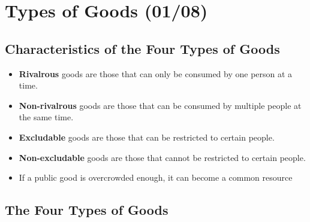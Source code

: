 \documentclass[
  letterpaper,
  DIV=11,
  numbers=noendperiod]{scrartcl}
\author{}
\date{}
\providecommand{\tightlist}{%
  \setlength{\itemsep}{0pt}\setlength{\parskip}{0pt}}\usepackage{longtable,booktabs,array}
\renewcommand*\contentsname{Table of contents}
\newcommand\contentsname{Table of contents}
\begin{document}

\newpage

\renewcommand*\contentsname{Table of Contents}
{
\hypersetup{linkcolor=}
\setcounter{tocdepth}{4}
\tableofcontents
}
\newpage{}

\section{Types of Goods (01/08)}\label{types-of-goods-0108}

\subsection{Characteristics of the Four Types of
Goods}\label{characteristics-of-the-four-types-of-goods}

\begin{itemize}
\tightlist
\item
  \textbf{Rivalrous} goods are those that can only be consumed by one
  person at a time.
\item
  \textbf{Non-rivalrous} goods are those that can be consumed by
  multiple people at the same time.
\item
  \textbf{Excludable} goods are those that can be restricted to certain
  people.
\item
  \textbf{Non-excludable} goods are those that cannot be restricted to
  certain people.
\item
  If a public good is overcrowded enough, it can become a common
  resource
\end{itemize}

\subsection{The Four Types of Goods}\label{the-four-types-of-goods}
\end{document}
